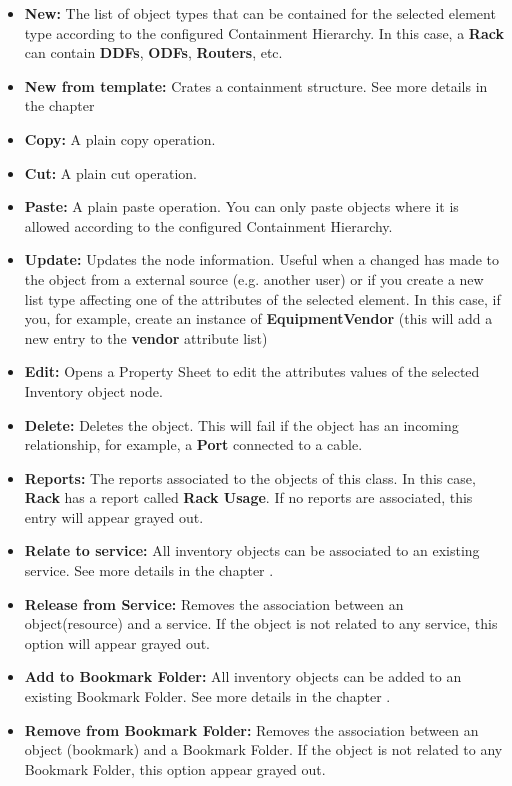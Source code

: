 \documentclass[a4paper]{article}
\begin{document}
	\begin{itemize}
		\item \textbf{New:} The list of object types that can be contained for the selected element type according to the configured Containment Hierarchy. In this case, a \textbf{Rack} can contain \textbf{DDFs}, \textbf{ODFs}, \textbf{Routers}, etc.
		\item \textbf{New from template:} Crates a containment structure. See more details in the chapter 
		\item \textbf{Copy:} A plain copy operation.
		\item \textbf{Cut:} A plain cut operation.
		\item \textbf{Paste:} A plain paste operation. You can only paste objects where it is allowed according to the configured Containment Hierarchy.
		\item \textbf{Update:} Updates the node information. Useful when a changed has made to the object from a external source (e.g. another user) or if you create a new list type affecting one of the attributes of the selected element. In this case, if you, for example, create an instance of \textbf{EquipmentVendor} (this will add a new entry to the \textbf{vendor} attribute list)
		\item \textbf{Edit:} Opens a Property Sheet to edit the attributes values of the selected Inventory object node.
		\item \textbf{Delete:} Deletes the object. This will fail if the object has an incoming relationship, for example, a \textbf{Port} connected to a cable.
		\item \textbf{Reports:} The reports associated to the objects of this class. In this case, \textbf{Rack} has a report called \textbf{Rack Usage}. If no reports are associated, this entry will appear grayed out.
		\item \textbf{Relate to service:} All inventory objects can be associated to an existing service. See more details in the chapter .
		\item \textbf{Release from Service:} Removes the association between an object(resource) and a service. If the object is not related to any service, this option will appear grayed out.
		\item \textbf{Add to Bookmark Folder:} All inventory objects can be added to an existing Bookmark Folder. See more details in the chapter .
		\item \textbf{Remove from Bookmark Folder:} Removes the association between an object (bookmark) and a Bookmark Folder. If the object is not related to any Bookmark Folder, this option appear grayed out.

\end{itemize}
\end{document}
